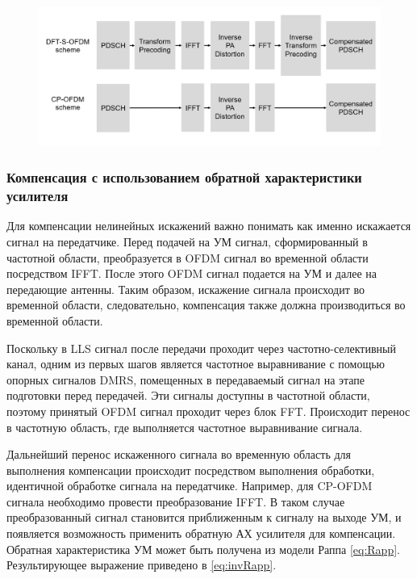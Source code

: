 \begin{figure}[h!]
    \centering
    \includegraphics[width=0.95\linewidth]{figs/compensation_scheme.png}
    \caption{}
    \label{fig:compensation_scheme}
\end{figure}


\subsubsection{Компенсация с использованием обратной характеристики усилителя}

Для компенсации нелинейных искажений важно понимать как именно искажается
сигнал на передатчике. Перед подачей на УМ сигнал, сформированный в
частотной области, преобразуется в OFDM сигнал во временной области
посредством IFFT. После этого OFDM сигнал подается на УМ и далее на
передающие антенны. Таким образом, искажение сигнала происходит во
временной области, следовательно, компенсация также должна производиться во
временной области. 

Поскольку в LLS сигнал после передачи проходит через частотно-селективный
канал, одним из первых шагов является частотное выравнивание с
помощью опорных сигналов DMRS, помещенных в передаваемый сигнал на этапе
подготовки перед передачей. Эти сигналы доступны в частотной области,
поэтому принятый OFDM сигнал проходит через блок FFT. Происходит перенос в
частотную область, где выполняется частотное выравнивание сигнала.

Дальнейший перенос искаженного сигнала во временную область для выполнения
компенсации происходит посредством выполнения обработки, идентичной
обработке сигнала на передатчике. Например, для CP-OFDM сигнала необходимо
провести преобразование IFFT. В таком случае преобразованный сигнал
становится приближенным к сигналу на выходе УМ, и появляется возможность
применить обратную АХ усилителя для компенсации. Обратная характеристика УМ
может быть получена из модели Раппа \ref{eq:Rapp}. Результирующее выражение
приведено в \ref{eq:invRapp}.


